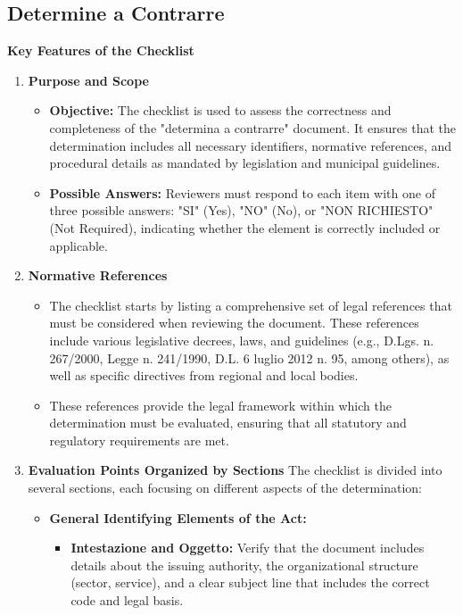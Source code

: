 \documentclass[../main.tex]{subfiles}
\begin{document}
\subsection{Determine a Contrarre}

\textbf{Key Features of the Checklist }
\begin{enumerate}
    \item \textbf{Purpose and Scope}
    \begin{itemize}
        \item \textbf{Objective:} The checklist is used to assess the correctness and completeness of the "determina a contrarre" document. It ensures that the determination includes all necessary identifiers, normative references, and procedural details as mandated by legislation and municipal guidelines.
        \item \textbf{Possible Answers:} Reviewers must respond to each item with one of three possible answers: "SI" (Yes), "NO" (No), or "NON RICHIESTO" (Not Required), indicating whether the element is correctly included or applicable.
    \end{itemize}
    \item \textbf{Normative References}
    \begin{itemize}
        \item The checklist starts by listing a comprehensive set of legal references that must be considered when reviewing the document. These references include various legislative decrees, laws, and guidelines (e.g., D.Lgs. n. 267/2000, Legge n. 241/1990, D.L. 6 luglio 2012 n. 95, among others), as well as specific directives from regional and local bodies.
        \item These references provide the legal framework within which the determination must be evaluated, ensuring that all statutory and regulatory requirements are met.
    \end{itemize}
    \item \textbf{Evaluation Points Organized by Sections}
 The checklist is divided into several sections, each focusing on different aspects of the determination:
    \begin{itemize}
        \item \textbf{General Identifying Elements of the Act:}
        \begin{itemize}
            \item \textbf{Intestazione and Oggetto:} Verify that the document includes details about the issuing authority, the organizational structure (sector, service), and a clear subject line that includes the correct code and legal basis.

\end{itemize}
\end{itemize}
\end{enumerate}
\end{document}

